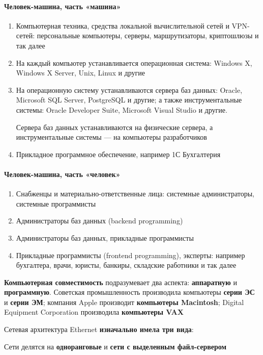 \documentclass{article}
\begin{document}
\begin{minipage}[t]{0.45\textwidth}
\paragraph{Человек-машина, часть «машина»}

\begin{enumerate}
    \item Компьютерная техника, средства локальной вычислительной сетей и VPN-сетей: персональные компьютеры, серверы, маршрутизаторы, криптошлюзы и так далее
    \item На каждый компьютер устанавливается операционная система: Windows X, Windows X Server, Unix, Linux и другие
    \item На операционную систему устанавливаются сервера баз данных: Oracle, Microsoft SQL Server, PostgreSQL и другие; а также инструментальные системы: Oracle Developer Suite, Microsoft Visual Studio и другие.

    Сервера баз данных устанавливаются на физические сервера, а инструментальные системы — на компьютеры разработчиков
    \item Прикладное программное обеспечение, например 1С Бухгалтерия
\end{enumerate}
\end{minipage}%
\hfill
\begin{minipage}[t]{0.45\textwidth}
\paragraph{Человек-машина, часть «человек»}

\begin{enumerate}
    \item Снабженцы и материально-ответственные лица: системные администраторы, системные программисты
    \item Администраторы баз данных (backend programming)
    \item Администраторы баз данных, прикладные программисты
    \item Прикладные программисты (frontend programming), эксперты: например бухгалтера, врачи, юристы, банкиры, складские работники и так далее
\end{enumerate}
\end{minipage}

\hfill

\textbf{Компьютерная совместимость} подразумевает два аспекта: \textbf{аппаратную} и \textbf{программную}. Советская промышленность производила компьютеры \textbf{серии ЭС} и \textbf{серии ЭМ}; компания Apple производит \textbf{компьютеры Macintosh}; Digital Equipment Corporation производила \textbf{компьютеры VAX}

\hfill

Сетевая архитектура Ethernet \textbf{изначально имела три вида}:

\begin{multienumerate}
\end{multienumerate}

Сети делятся на \textbf{одноранговые} и \textbf{сети с выделенным файл-сервером}
\end{document}
